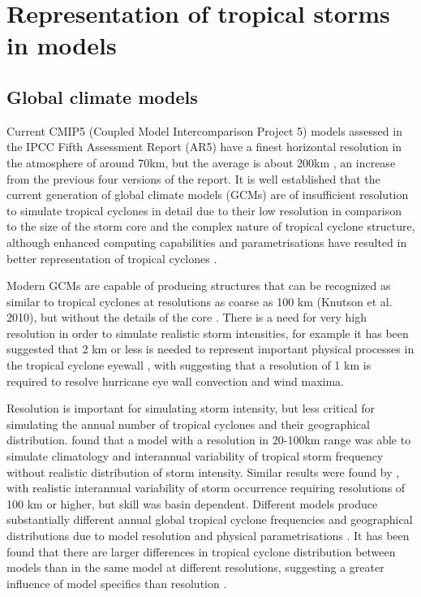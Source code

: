 \section{Representation of tropical storms in models}

\subsection{Global climate models}

Current CMIP5 (Coupled Model Intercomparison Project 5) models assessed in the IPCC Fifth Assessment Report (AR5) have a finest horizontal resolution in the atmosphere of around 70km, but the average is about 200km \citep{climodaus}, an increase from the previous four versions of the report.
It is well established that the current generation of global climate models (GCMs) are of insufficient resolution to simulate tropical cyclones in detail due to their low resolution in comparison to the size of the storm core \citep{lin2012physically} and the complex nature of tropical cyclone structure, although enhanced computing capabilities and parametrisations have resulted in better representation of tropical cyclones \citep{zhao2009simulations, bengtsson2007may, walsh2007objectively}.

Modern GCMs are capable of producing structures that can be recognized as similar to tropical cyclones at resolutions as coarse as 100 km (Knutson et al. 2010), but without the details of the core \citep{mcdonald2005tropical}. There is a need for very high resolution in order to simulate realistic storm intensities, \citep{bender2010modeled, emanuel2008hurricanes} for example it has been suggested that 2 km or less is needed to represent important physical processes in the tropical cyclone eyewall \citep{gentry2010sensitivity}, with \cite{chen2007cblast} suggesting that a resolution of 1 km is required to resolve hurricane eye wall convection and wind maxima.


Resolution is important for simulating storm intensity, but less critical for simulating the annual number of tropical cyclones and their geographical distribution. \cite{zhao2009simulations} found that a model with a resolution in 20-100km range was able to simulate climatology and interannual variability of tropical storm frequency without realistic distribution of storm intensity. Similar results were found by \cite{strachan2013investigating}, with realistic interannual variability of storm occurrence requiring resolutions of 100 km or higher, but skill was basin dependent. Different models produce substantially different annual global tropical cyclone frequencies and geographical distributions due to model resolution and physical parametrisations \citep{zhao2013robust}. It has been found that there are larger differences in tropical cyclone distribution between models than in the same model at different resolutions, suggesting a greater influence of model specifics than resolution \citep{shaevitz2014characteristics}.


